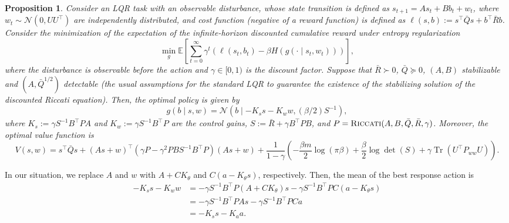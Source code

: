 \documentclass[letterpaper]{article} %
\DeclareMathOperator{\Tr}{Tr}     %
\providecommand{\E}{\mathbb{E}} %
\newtheorem{proposition}{Proposition}
\begin{document}
\begin{proposition}\label{thm:opt_f_policy_observable_disturbance}
    Consider an LQR task with an observable disturbance, whose state transition is defined as $s_{t+1} = A s_t + B b_t + w_t$, where $w_t \sim \mathcal{N}(0, UU^\top)$ are independently distributed, and cost function (negative of a reward function) is defined as $\ell(s, b):= s^\top \bar{Q} s + b^\top \bar{R} b$.
    Consider the minimization of the expectation of the infinite-horizon discounted cumulative reward under entropy regularization
    \begin{equation}
        \min_{g} \E\left[\sum_{t=0}^\infty \gamma^t \left(\ell(s_t, b_t) - \beta H(g(\cdot \mid s_t, w_t)) \right)\right] ,
    \end{equation}
    where the disturbance is observable before the action and $\gamma \in [0, 1)$ is the discount factor.
    Suppose that $\bar{R} \succ 0$, $\bar{Q} \succcurlyeq 0$, $(A, B)$ stabilizable and $(A, \bar{Q}^{1/2})$ detectable (the usual assumptions for the standard LQR to guarantee the existence of the stabilizing solution of the discounted Riccati equation).
    Then, the optimal policy is given by 
    \begin{equation}
        g(b \mid s, w) = \mathcal{N}(b \mid - K_s s - K_w w, (\beta/2) S^{-1}), \label{eq:lqr_opt_follower_mg}
    \end{equation}
    where $K_s := \gamma S^{-1} B^\top P A$ and $K_w := \gamma S^{-1} B^\top P$ are the control gains, $S := \bar{R} + \gamma B^\top P B$, and $P = \text{\textsc{Riccati}}(A, B, \bar{Q}, \bar{R}, \gamma)$. 
    Moreover, the optimal value function is 
    \begin{equation}
        V(s, w) = s^\top \bar{Q} s + (A s + w)^\top (\gamma P - \gamma^2 P B S^{-1} B^\top P) (A s + w) 
        + \frac{1}{1 - \gamma} \left( - \frac{\beta m}{2} \log(\pi \beta) +  \frac{\beta}{2} \log \det(S) + \gamma \Tr(U^\top P_{ww}U) \right).
    \end{equation}
\end{proposition}

In our situation, we replace $A$ and $w$ with $A + C K_\theta$ and $C (a - K_\theta s)$, respectively. 
Then, the mean of the best response action is 
\begin{subequations}
\begin{align}
    - K_s s - K_w w 
    &= - \gamma S^{-1} B^\top P (A + C K_\theta) s - \gamma S^{-1} B^\top P C (a - K_\theta s)\\
    &= - \gamma S^{-1} B^\top P A s - \gamma S^{-1} B^\top P C a\\
    &= - K_s s - K_a a .
\end{align}
\end{subequations}
\end{document}
